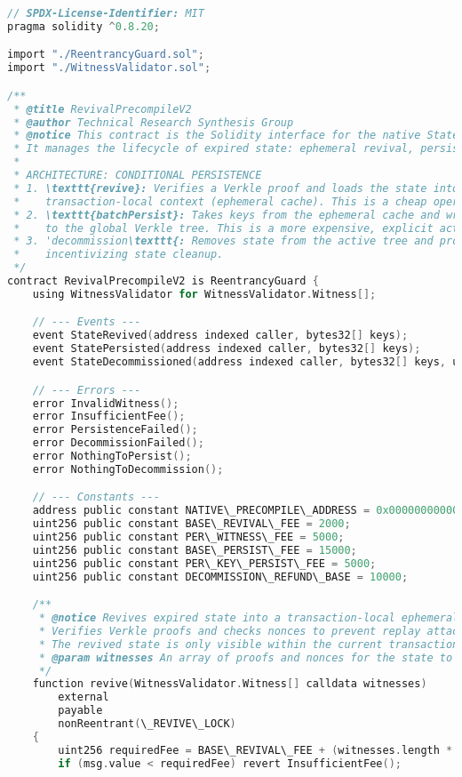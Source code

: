 \documentclass{article}
\begin{document}
\begin{lstlisting}[language=C,caption={RevivalPrecompileV2.sol - Main Contract Interface},label={lst:main}]
// SPDX-License-Identifier: MIT
pragma solidity ^0.8.20;

import "./ReentrancyGuard.sol";
import "./WitnessValidator.sol";

/**
 * @title RevivalPrecompileV2
 * @author Technical Research Synthesis Group
 * @notice This contract is the Solidity interface for the native State Revival Precompile.
 * It manages the lifecycle of expired state: ephemeral revival, persistence, and decommissioning.
 *
 * ARCHITECTURE: CONDITIONAL PERSISTENCE
 * 1. \texttt{revive}: Verifies a Verkle proof and loads the state into a temporary,
 *    transaction-local context (ephemeral cache). This is a cheap operation.
 * 2. \texttt{batchPersist}: Takes keys from the ephemeral cache and writes them permanently
 *    to the global Verkle tree. This is a more expensive, explicit action.
 * 3. 'decommission\texttt{: Removes state from the active tree and provides a gas refund,
 *    incentivizing state cleanup.
 */
contract RevivalPrecompileV2 is ReentrancyGuard {
    using WitnessValidator for WitnessValidator.Witness[];

    // --- Events ---
    event StateRevived(address indexed caller, bytes32[] keys);
    event StatePersisted(address indexed caller, bytes32[] keys);
    event StateDecommissioned(address indexed caller, bytes32[] keys, uint256 gasRefund);

    // --- Errors ---
    error InvalidWitness();
    error InsufficientFee();
    error PersistenceFailed();
    error DecommissionFailed();
    error NothingToPersist();
    error NothingToDecommission();

    // --- Constants ---
    address public constant NATIVE\_PRECOMPILE\_ADDRESS = 0x0000000000000000000000000000000000000000; 
    uint256 public constant BASE\_REVIVAL\_FEE = 2000;
    uint256 public constant PER\_WITNESS\_FEE = 5000;
    uint256 public constant BASE\_PERSIST\_FEE = 15000;
    uint256 public constant PER\_KEY\_PERSIST\_FEE = 5000;
    uint256 public constant DECOMMISSION\_REFUND\_BASE = 10000;

    /**
     * @notice Revives expired state into a transaction-local ephemeral cache.
     * Verifies Verkle proofs and checks nonces to prevent replay attacks.
     * The revived state is only visible within the current transaction until persisted.
     * @param witnesses An array of proofs and nonces for the state to be revived.
     */
    function revive(WitnessValidator.Witness[] calldata witnesses)
        external
        payable
        nonReentrant(\_REVIVE\_LOCK)
    {
        uint256 requiredFee = BASE\_REVIVAL\_FEE + (witnesses.length * PER\_WITNESS\_FEE);
        if (msg.value < requiredFee) revert InsufficientFee();


\end{lstlisting}
\end{document}
